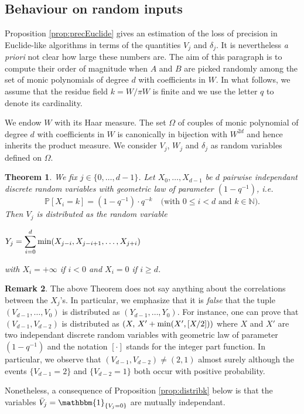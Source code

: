 \documentclass{jT}
\numberwithin{equation}{section}
\newtheorem{theo}{Theorem}[section]
\theoremstyle{definition}
\newtheorem{rem}[theo]{Remark}
\newcommand{\N}{\mathbb N}
\renewcommand{\min}{\text{\rm min}}
\renewcommand{\P}{\mathbb P}
\newcommand{\A}{W}
\begin{document}
\subsection{Behaviour on random inputs}
\label{subsec:proba}

Proposition \ref{prop:precEuclide} gives an estimation of the loss of 
precision in Euclide-like algorithms in terms of the quantities $V_j$ 
and $\delta_j$. It is nevertheless \emph{a priori} not clear how large 
these numbers are. The aim of this paragraph is to compute their order 
of magnitude when $A$ and $B$ are picked randomly among the set of monic 
polynomials of degree $d$ with coefficients in $\A$. In what follows, we 
assume that the residue field $k = \A/\pi\A$ is finite and we use the 
letter $q$ to denote its cardinality.

We endow $\A$ with its Haar measure. The set $\Omega$ of couples of 
monic polynomial of degree $d$ with coefficients in $\A$ is canonically 
in bijection with $\A^{2d}$ and hence inherits the product measure. 
We consider $V_j$, $W_j$ and $\delta_j$ as random variables defined on 
$\Omega$.

\begin{theo}
\label{th:lawVj}
We fix $j \in \{0, \ldots, d-1\}$.
Let $X_0, \ldots, X_{d-1}$ be $d$ pairwise independant discrete random 
variables with geometric law of parameter $(1 - q^{-1})$, \emph{i.e.}
$$\P[X_i = k] = (1 - q^{-1}) \cdot q^{-k} \quad 
\text{(with } 0 \leq i < d \text{ and } k \in \N \text{)}.$$
Then $V_j$ is distributed as the random variable
\begin{center}
$\displaystyle Y_j = \sum_{i=0}^d \min(X_{j-i}, X_{j-i+1}, \ldots, X_{j+i})$
\end{center}
\noindent
with $X_i = +\infty$ if $i < 0$ and $X_i = 0$ if $i \geq d$.
\end{theo}

\begin{rem}
The above Theorem does not say anything about the correlations between
the $X_j$'s. In particular, we emphasize that it is \emph{false} that
the tuple $(V_{d-1}, \ldots, V_0)$ is distributed as $(Y_{d-1}, \ldots,
Y_0)$. For instance, one can prove that $(V_{d-1}, 
V_{d-2})$ is distributed as 
$(X, \, X' + \min(X', [X/2]))$
where $X$ and $X'$ are two independant discrete random variables with 
geometric law of parameter $(1 - q^{-1})$ and the notation $[\cdot]$ 
stands for the integer part function. In particular, we observe that 
$(V_{d-1}, V_{d-2}) \neq (2,1)$ almost surely although the events 
$\{V_{d-1} = 2\}$ and $\{V_{d-2} = 1\}$ both occur with positive 
probability.

Nonetheless, a consequence of Proposition \ref{prop:distribk} below is 
that the variables $\bar V_j = \mathbbm{1}_{\{V_j = 0\}}$ are mutually 
independant.
\end{rem}
\end{document}
